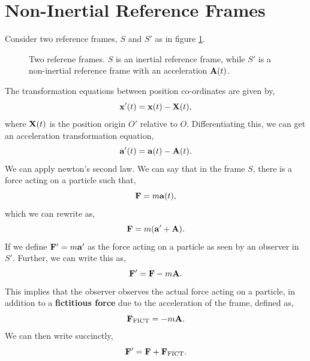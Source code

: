 \documentclass{book}
\begin{document}
\section{Non-Inertial Reference Frames}
Consider two reference frames, $S$ and $S'$ as in figure \ref{fig:frames}.
\begin{figure}[h]
    \centering
    \caption{Two referene frames. $S$ is an inertial reference frame, while $S'$ is a non-inertial reference frame with an acceleration $\vb{A}(t)$.}
    \label{fig:frames}
\end{figure}
The transformation equations between position co-ordinates are given by,
\begin{equation}
    \vb{x}'(t) = \vb{x}(t) - \vb{X}(t),
\end{equation}
where $\vb{X}(t)$ is the position origin $O'$ relative to $O$. Differentiating this, we can get an acceleration transformation equation,
\begin{equation}
    \vb{a}'(t) = \vb{a}(t) - \vb{A}(t).
\end{equation}
We can apply newton's second law. We can say that in the frame $S$, there is a force acting on a particle such that,
\begin{equation}
    \vb{F} = m\vb{a}(t),
\end{equation}
which we can rewrite as,
\begin{equation}
    \vb{F} = m(\vb{a}' + \vb{A}).
\end{equation}
If we define $\vb{F}' = m\vb{a}'$ as the force acting on a particle as seen by an observer in $S'$. Further, we can write this as,
\begin{equation}
    \vb{F'} = \vb{F} - m\vb{A}.
\end{equation}
This implies that the observer observes the actual force acting on a particle, in addition to a \textbf{fictitious force} due to the acceleration of the frame, defined as,
\begin{equation}
    \vb{F}_{\text{FICT}} = -m\vb{A}.
\end{equation}
We can then write succinctly,
\begin{equation}
    \vb{F'} = \vb{F} + \vb{F}_{\text{FICT}}.
\end{equation}
\end{document}

